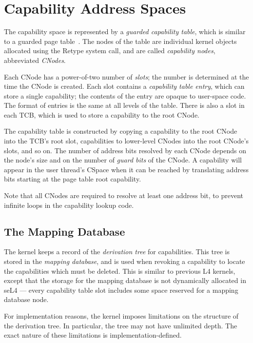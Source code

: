\section[cspace]{Capability Address Spaces}

The capability space is represented by a \emph{guarded capability table},
which is similar to a guarded page table~\cite{Liedtke-94a}. The nodes of the
table are individual kernel objects allocated using the Retype system call,
and are called \emph{capability nodes}, abbreviated \emph{CNodes}.

Each CNode has a power-of-two number of \emph{slots}; the number is determined
at the time the CNode is created. Each slot contains a \emph{capability table
entry}, which can store a single capability; the contents of the entry are
opaque to user-space code. The format of entries is the same at all levels of
the table. There is also a slot in each TCB, which is used to store a
capability to the root CNode.


The capability table is constructed by copying a capability to the root CNode
into the TCB's root slot, capabilities to lower-level CNodes into the root
CNode's slots, and so on. The number of address bits resolved by each CNode
depends on the node's size and on the number of \emph{guard bits} of the CNode. 
A capability will appear in the user thread's CSpace when it can be reached by
translating address bits starting at the page table root capability.

Note that all CNodes are required to resolve at least one address bit, to
prevent infinite loops in the capability lookup code.

\subsection[mdb]{The Mapping Database}

The kernel keeps a record of the \emph{derivation tree} for capabilities. This
tree is stored in the \emph{mapping database}, and is used when revoking a
capability to locate the capabilities which must be deleted. This is similar to
previous L4 kernels, except that the storage for the mapping database is not
dynamically allocated in seL4 --- every capability table slot includes some
space reserved for a mapping database node.

For implementation reasons, the kernel imposes limitations on the structure of
the derivation tree. In particular, the tree may not have unlimited depth. The
exact nature of these limitations is implementation-defined.

